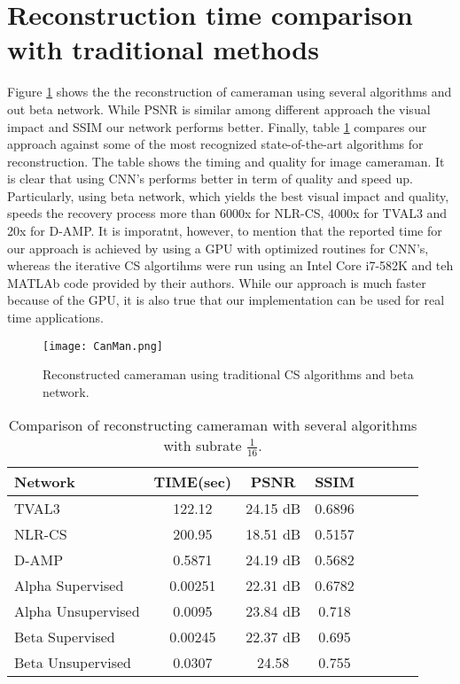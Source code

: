 \section{Reconstruction time comparison with traditional methods}
Figure \ref{fig:Canman1} shows the the reconstruction of cameraman using several algorithms and out beta network. While PSNR is similar among different approach the visual impact and SSIM our network performs better.
\newline \newline
Finally, table \ref{tab:summaryComp} compares our approach against some of the most recognized state-of-the-art algorithms for reconstruction. The table shows the timing and quality for image cameraman. It is clear that using CNN's performs better in term of quality and speed up. Particularly, using beta network, which yields the best visual impact and quality, speeds the recovery process more than 6000x for NLR-CS, 4000x for TVAL3 and 20x for D-AMP. It is imporatnt, however, to mention that the reported time for our approach is achieved by using a GPU with optimized routines for CNN's, whereas the iterative CS algortihms were run using an Intel Core i7-582K and teh MATLAb code provided by their authors. While our approach is much faster because of the GPU, it is also true that our implementation can be used for real time applications.  

\begin{figure}[!htb] 
\vspace{1.5cm}
\centering 
\texttt{[image: CanMan.png]}
\caption[Reconstructed cameraman with traditional methods]{Reconstructed cameraman using traditional CS algorithms and beta network.}
\label{fig:Canman1} 
\end{figure} 

\begin{table}[!htb]
\caption[Timing and quality metrics cameranman]{Comparison of reconstructing cameraman with several algorithms with subrate $\frac{1}{16}$.}
\label{tab:summaryComp}
\begin{center}
\begin{tabular}{l*{6}{c}r}
Network              & TIME(sec) & PSNR & SSIM \\
\hline
TVAL3 & 122.12 & 24.15 dB & 0.6896\\
NLR-CS & 200.95 & 18.51 dB & 0.5157\\
D-AMP & 0.5871 & 24.19 dB & 0.5682\\
Alpha Supervised   & 0.00251 & 22.31 dB & 0.6782\\
Alpha Unsupervised     & 0.0095 & 23.84 dB & 0.718\\
Beta Supervised & 0.00245 & 22.37 dB & 0.695 \\
Beta Unsupervised & 0.0307 & 24.58 & 0.755\\
\bottomrule 
\end{tabular}%
\end{center}  
\end{table}
\FloatBarrier


